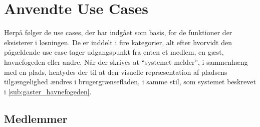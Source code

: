 \section{Anvendte Use Cases}

Herpå følger de use cases, der har indgået som basis, for de funktioner der eksisterer i løsningen. De er inddelt i fire kategorier, alt efter hvorvidt den pågældende use case tager udgangspunkt fra enten et medlem, en gæst, havnefogeden eller andre. Når der skrives at \enquote{systemet melder}, i sammenhæng med en plads, hentydes der til at den visuelle repræsentation af pladsens tilgængelighed ændres i brugergrænsefladen, i samme stil, som systemet beskrevet i \cref{sub:gaster_havnefogeden}.

\subsection{Medlemmer}  
